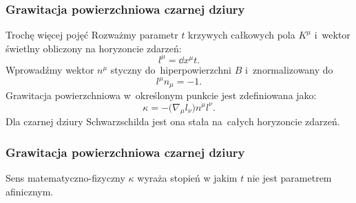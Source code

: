 \documentclass{beamer}  %
\begin{document}
\begin{frame}
  \frametitle{Grawitacja powierzchniowa czarnej dziury}

  \begin{block}{Trochę więcej pojęć}
    Rozważmy parametr $t$ krzywych całkowych pola $K^{ \mu }$ i~wektor
    świetlny obliczony na horyzoncie zdarzeń:
    \begin{equation}
      \label{eq:HawkingPromieniowanie-31}
      l^{ \mu } =  \dd{}{ x^{ \mu } }{ t }.
    \end{equation}
    Wprowadźmy wektor $n^{ \mu }$ styczny do~hiperpowierzchni $B$
    i~znormalizowany do
    \begin{equation}
      \label{eq:HawkingPromieniowanie-32}
      l^{ \mu } n_{ \mu } = -1.
    \end{equation}
    Grawitacja powierzchniowa w~określonym punkcie jest zdefiniowana
    jako:
    \begin{equation}
      \label{eq:HawkingPromieniowanie-33}
      \kappa = - \big( \nabla_{ \mu } l_{ \nu } \big) n^{ \mu } l^{ \nu }.
    \end{equation}
    Dla czarnej dziury Schwarzschilda jest ona stała na~całych
    horyzoncie zdarzeń.
  \end{block}

\end{frame}





\begin{frame}
  \frametitle{Grawitacja powierzchniowa czarnej dziury}

  \begin{block}{Sens matematyczno-fizyczny}
    $\kappa$ wyraża stopień w jakim $t$ nie jest parametrem
    afinicznym.
  \end{block}

\end{frame}
\end{document}
